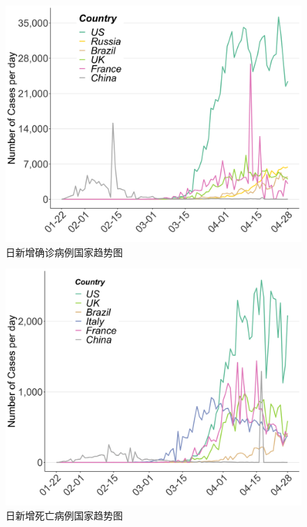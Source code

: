 \documentclass[
]{article}
\begin{document}
\begin{figure}[H]
\centering
{}
\caption{日新增确诊病例国家趋势图}
\includegraphics[]{./input/covid2.png}
\end{figure}

\begin{figure}[H]
\centering
{}
\caption{日新增死亡病例国家趋势图}
\includegraphics[]{./input/covid3.png}
\end{figure}

\vspace{-7mm}
\end{document}
